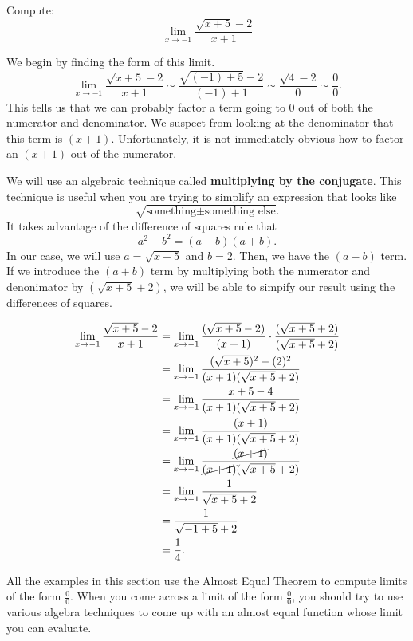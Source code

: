 \documentclass{ximera}
\begin{document}
\begin{example}
  Compute:
  \[
  \lim_{x\to-1} \frac{\sqrt{x+5}-2}{x+1}
  \]

\begin{explanation} 
  We begin by finding the form of this limit.
  \[
  \lim_{x\to-1} \frac{\sqrt{x+5}-2}{x+1} \sim \frac{\sqrt{(-1)+5}-2}{(-1)+1} \sim \frac{\sqrt{4}-2}{0} \sim \frac{0}{0}.
  \]
  This tells us that we can probably factor a term going to $0$ out of
  both the numerator and denominator.  We suspect from looking at the
  denominator that this term is $(x+1)$.  Unfortunately, it is not
  immediately obvious how to factor an $(x+1)$ out of the numerator.
 
  We will use an algebraic technique called \textbf{multiplying by the
    conjugate}.  This technique is useful when you are trying to
  simplify an expression that looks like
  \[
  \sqrt{\text{something} \pm \text{something else}}.
  \]
  It takes advantage of the difference of squares rule that
  \[
  a^2-b^2=(a-b)(a+b).
  \]
  In our case, we will use $a=\sqrt{x+5}$ and $b=2$.  Then, we have
  the $(a-b)$ term.  If we introduce the $(a+b)$ term by multiplying
  both the numerator and denonimator by $(\sqrt{x+5}+2)$, we will be
  able to simpify our result using the differences of squares.
 
\begin{align*}
\lim_{x\to-1} \frac{\sqrt{x+5}-2}{x+1}&=
\lim_{x\to-1} \frac{(\sqrt{x+5}-2)}{(x+1)} \cdot \frac{(\sqrt{x+5}+2)}{(\sqrt{x+5}+2)} \\
&=\lim_{x\to-1} \frac{(\sqrt{x+5})^2-(2)^2}{(x+1)(\sqrt{x+5}+2)} \\
&=\lim_{x\to-1} \frac{x+5-4}{(x+1)(\sqrt{x+5}+2)} \\
&=\lim_{x\to-1} \frac{(x+1)}{(x+1)(\sqrt{x+5}+2)} \\
&=\lim_{x\to-1} \frac{\cancel{(x+1)}}{\cancel{(x+1)}(\sqrt{x+5}+2)} \\
&=\lim_{x\to-1} \frac{1}{\sqrt{x+5}+2}\\
&= \frac{1}{\sqrt{-1+5}+2}\\
&=\frac{1}{4}.
\end{align*}
\end{explanation}
\end{example}

All the examples in this section use the Almost Equal Theorem to
compute limits of the form $\frac{0}{0}$.  When you come across a
limit of the form $\frac{0}{0}$, you should try to use various algebra
techniques to come up with an almost equal function whose limit you
can evaluate.
\end{document}
